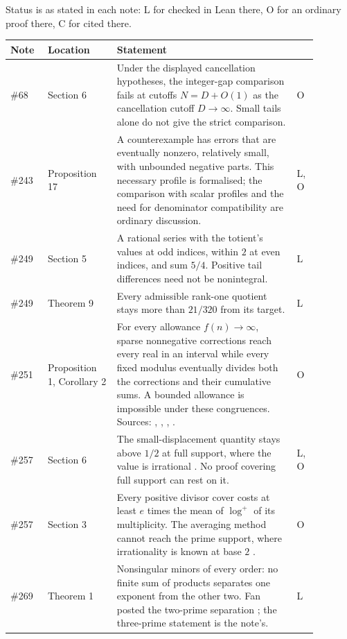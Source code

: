 \documentclass[11pt]{article}
\begin{document}
Status is as stated in each note: L for checked in Lean there, O for an
ordinary proof there, C for cited there.

\begin{longtable}{p{0.10\linewidth}p{0.20\linewidth}p{0.52\linewidth}p{0.06\linewidth}}
\hline
Note & Location & Statement & \\
\hline
\#68 \cite{plectis68} & Section 6 & Under the displayed cancellation hypotheses, the integer-gap comparison fails at cutoffs $N=D+O(1)$ as the cancellation cutoff $D\to\infty$.  Small tails alone do not give the strict comparison. & O \\
\#243 \cite{plectis243} & Proposition 17 & A counterexample has errors that are eventually nonzero, relatively small, with unbounded negative parts.  This necessary profile is formalised; the comparison with scalar profiles and the need for denominator compatibility are ordinary discussion. & L, O \\
\#249 \cite{plectis249} & Section 5 & A rational series with the totient's values at odd indices, within $2$ at even indices, and sum $5/4$.  Positive tail differences need not be nonintegral. & L \\
\#249 \cite{plectis249} & Theorem 9 & Every admissible rank-one quotient stays more than $21/320$ from its target. & L \\
\#251 \cite{plectis251} & Proposition 1, Corollary 2 & For every allowance $f(n)\to\infty$, sparse nonnegative corrections reach every real in an interval while every fixed modulus eventually divides both the corrections and their cumulative sums.  A bounded allowance is impossible under these congruences.  Sources: \cite{fridy1966}, \cite[Lemma~4]{crmarickovac2025}, \cite[Lemma~5.1]{kovactao2024}, \cite{vandoornkovac2025}. & O \\
\#257 \cite{plectis257} & Section 6 & The small-displacement quantity stays above $1/2$ at full support, where the value is irrational \cite{erdos1948}.  No proof covering full support can rest on it. & L, O \\
\#257 \cite{plectis257} & Section 3 & Every positive divisor cover costs at least $e$ times the mean of $\log^+$ of its multiplicity.  The averaging method cannot reach the prime support, where irrationality is known at base $2$ \cite{taoteravainen2025}. & O \\
\#269 \cite{plectis269} & Theorem 1 & Nonsingular minors of every order: no finite sum of products separates one exponent from the other two.  Fan posted the two-prime separation \cite{fan2026comment}; the three-prime statement is the note's. & L \\

\end{longtable}
\end{document}
